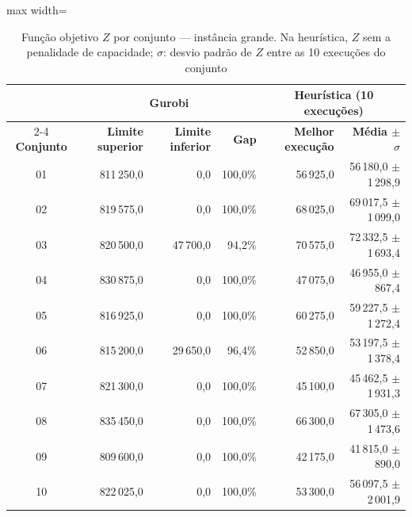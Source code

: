 \begin{table}[htbp]
    \caption{Função objetivo $Z$ por conjunto --- instância grande. Na heurística, $Z$ sem a penalidade de capacidade; $\sigma$: desvio padrão de $Z$ entre as 10 execuções do conjunto}
    \label{tab:res-z-grande}
    \centering
    \begin{adjustbox}{max width=\textwidth}
    \begin{tabular}{crrrrr}
        \hline
        & \multicolumn{3}{c}{\textbf{Gurobi}} & \multicolumn{2}{c}{\textbf{Heurística (10 execuções)}} \\
        \cline{2-4} \cline{5-6}
        \textbf{Conjunto} & \textbf{Limite superior} & \textbf{Limite inferior} & \textbf{Gap} & \textbf{Melhor execução} & \textbf{Média $\pm$ $\sigma$} \\
        \hline
        01 & 811\,250,0 & 0,0 & 100,0\% & 56\,925,0 & 56\,180,0 $\pm$ 1\,298,9 \\
        02 & 819\,575,0 & 0,0 & 100,0\% & 68\,025,0 & 69\,017,5 $\pm$ 1\,099,0 \\
        03 & 820\,500,0 & 47\,700,0 & 94,2\% & 70\,575,0 & 72\,332,5 $\pm$ 1\,693,4 \\
        04 & 830\,875,0 & 0,0 & 100,0\% & 47\,075,0 & 46\,955,0 $\pm$ 867,4 \\
        05 & 816\,925,0 & 0,0 & 100,0\% & 60\,275,0 & 59\,227,5 $\pm$ 1\,272,4 \\
        06 & 815\,200,0 & 29\,650,0 & 96,4\% & 52\,850,0 & 53\,197,5 $\pm$ 1\,378,4 \\
        07 & 821\,300,0 & 0,0 & 100,0\% & 45\,100,0 & 45\,462,5 $\pm$ 1\,931,3 \\
        08 & 835\,450,0 & 0,0 & 100,0\% & 66\,300,0 & 67\,305,0 $\pm$ 1\,473,6 \\
        09 & 809\,600,0 & 0,0 & 100,0\% & 42\,175,0 & 41\,815,0 $\pm$ 890,0 \\
        10 & 822\,025,0 & 0,0 & 100,0\% & 53\,300,0 & 56\,097,5 $\pm$ 2\,001,9 \\
        \hline
    \end{tabular}
    \end{adjustbox}
\end{table}

